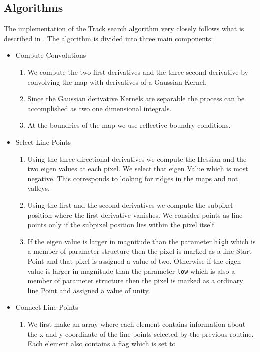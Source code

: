 \subsection{Algorithms}
The implementation of the Track search algorithm very closely follows
what is described in \cite{Steger}. The algorithm is divided into
three main components:
\begin{itemize}
\item Compute Convolutions
\begin{enumerate}
\item We compute the two first derivatives and the three second
derivative by convolving the map with derivatives of a Gaussian
Kernel. 
\item Since the Gaussian derivative Kernels are separable the
process can be accomplished as two one dimensional integrals. 
\item At the boundries of the map we use reflective boundry conditions.
\end{enumerate}	
\item Select Line Points
\begin{enumerate}
\item Using the three directional derivatives we compute the Hessian
and the two eigen values at each pixel. We select that eigen Value which is most
negative. This corresponds to looking for ridges in the maps and not
valleys.
\item Using the first and the second derivatives we compute the
subpixel position where the first derivative vanishes. We consider
points as line points only if the subpixel position lies within the
pixel itself. 
\item If the eigen value is larger in magnitude than the parameter 
{\tt high} which is a member of parameter structure then the pixel is
marked as a line Start Point and that pixel is assigned a value of
two. Otherwise if the  eigen value is larger in magnitude than the parameter 
{\tt low} which is also a member of parameter structure then the pixel is
marked as a ordinary line Point and assigned a value of unity.  
\end{enumerate}	
\item Connect Line Points
\begin{enumerate}
\item We first make an array where each element contains information
about the x and y coordinate of the line points selected by the
previous routine. Each element also contains a flag which is set to

\end{enumerate}
\end{itemize}
